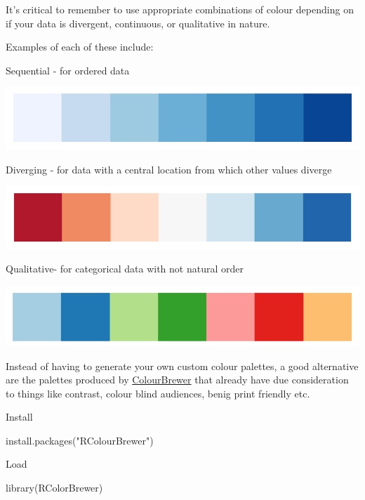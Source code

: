 \documentclass[
]{book}
\newenvironment{Shaded}{\begin{snugshade}}{\end{snugshade}}
\newcommand{\FunctionTok}[1]{\textcolor[rgb]{0.00,0.00,0.00}{#1}}
\newcommand{\NormalTok}[1]{#1}
\newcommand{\StringTok}[1]{\textcolor[rgb]{0.31,0.60,0.02}{#1}}
\begin{document}
It's critical to remember to use appropriate combinations of colour depending on if your data is divergent, continuous, or qualitative in nature.

Examples of each of these include:

Sequential - for ordered data

\includegraphics{images/sequential.png}

Diverging - for data with a central location from which other values diverge

\includegraphics{images/diverging.png}

Qualitative- for categorical data with not natural order

\includegraphics{images/qualitative.png}

Instead of having to generate your own custom colour palettes, a good alternative are the palettes produced by \href{https://colorbrewer2.org/}{ColourBrewer} that already have due consideration to things like contrast, colour blind audiences, benig print friendly etc.

Install

\begin{Shaded}
\begin{Highlighting}[]
\FunctionTok{install.packages}\NormalTok{(}\StringTok{"RColourBrewer"}\NormalTok{)}
\end{Highlighting}
\end{Shaded}

Load

\begin{Shaded}
\begin{Highlighting}[]
\FunctionTok{library}\NormalTok{(RColorBrewer)}
\end{Highlighting}
\end{Shaded}
\end{document}
